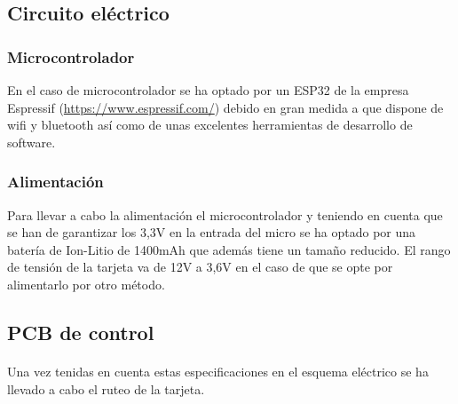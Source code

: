 \documentclass[paper=a4, fontsize=11pt,twoside]{scrartcl}	%
\begin{document}
    \subsection{Circuito eléctrico}
        \subsubsection{Microcontrolador} 
            En el caso de microcontrolador se ha optado por un ESP32 de la empresa Espressif (\url{https://www.espressif.com/})
            debido en gran medida a que dispone de wifi y bluetooth así como de unas excelentes herramientas
            de desarrollo de software. 
        \subsubsection{Alimentación} 
            Para llevar a cabo la alimentación el microcontrolador y teniendo en cuenta que se han de garantizar los 3,3V en la entrada
            del micro se ha optado por una batería de Ion-Litio de 1400mAh que además tiene un tamaño reducido. El rango de tensión de la
            tarjeta va de 12V a 3,6V en el caso de que se opte por alimentarlo por otro método.
    \subsection{PCB de control}
        \paragraph{}
        Una vez tenidas en cuenta estas especificaciones en el esquema eléctrico se ha llevado a cabo el ruteo de la tarjeta.
\end{document}
